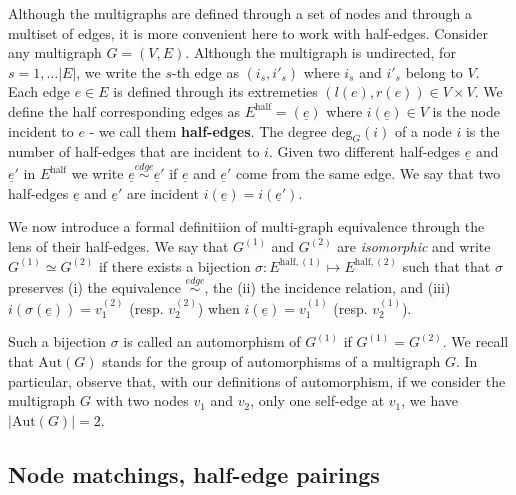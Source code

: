 \documentclass{article}
\begin{document}
Although the multigraphs are defined through a set of nodes and through a multiset of edges, it is more convenient here to work with half-edges. Consider any multigraph $G=(V,E)$. Although the multigraph is undirected, for $s=1,\ldots |E|$, we write the $s$-th edge as $(i_s,i'_s)$ where $i_s$ and $i'_s$ belong to $V$. 
Each edge $e\in E$ is defined through its extremeties $(l(e), r(e))\in V\times V$. We define the half corresponding edges as $E^{\mathrm{\mathrm{half}}}=  (\underline{e})$ where $i(\underline{e})\in V$ is the node incident to $e$ - we call them {\bf half-edges}. The degree $\mathrm{deg}_G(i)$ of a node $i$ is the number of half-edges that are incident to $i$. Given two different half-edges $\underline{e}$ and  $\underline{e}'$ in $E^{\mathrm{\mathrm{half}}}$ we write $\underline{e}\stackrel{edge}{\sim} \underline{e}'$ if $\underline{e}$ and $\underline{e}'$ come from the same edge. We say that two half-edges $\underline{e}$ and $\underline{e}'$ are incident $i(\underline{e})= i(\underline{e}')$. 



We now introduce a formal definitiion of multi-graph equivalence through the lens of their half-edges. We say that $G^{(1)}$ and $G^{(2)}$ are \emph{isomorphic} and write $G^{(1)}\simeq G^{(2)}$ if there exists a bijection $\sigma: E^{\mathrm{\mathrm{half}},(1)} \mapsto E^{\mathrm{\mathrm{half}},(2)}$ such that that $\sigma$ preserves (i) the equivalence  $\stackrel{edge}{\sim}$, the (ii) the incidence relation, and (iii)  $i(\sigma(\underline{e}))=v^{(2)}_1$ (resp. $v^{(2)}_2$) when  $i(\underline{e})= v^{(1)}_1$ (resp. $v^{(1)}_2$). %

Such a bijection $\sigma$ is called an automorphism of $G^{(1)}$ if $G^{(1)}=G^{(2)}$. We recall that  $\mathrm{Aut}(G)$ stands for the group of automorphisms of a multigraph $G$. In particular, observe that, with our definitions of automorphism, if we consider the multigraph $G$ with two nodes $v_1$ and $v_2$, only one self-edge at $v_1$, we have $|\mathrm{Aut}(G)|=2$. 




\subsection{Node matchings, half-edge pairings}\label{pairmatch}
\end{document}
